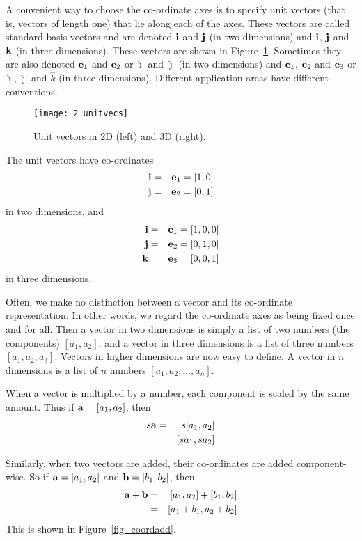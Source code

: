 A convenient way to choose the co-ordinate axes is to specify unit
vectors (that is, vectors of length one) that lie along each of the
axes. These vectors are called standard basis vectors and are denoted
${\bf i}$ and ${\bf j}$ (in two dimensions) and ${\bf i}$, ${\bf j}$
and ${\bf k}$ (in three dimensions). These vectors are shown in 
Figure~\ref{fig_unitvecs}. Sometimes they are also denoted
${\bf e}_1$ and ${\bf e}_2$ or $\hat{\imath}$ and $\hat{\jmath}$ 
(in two dimensions) and ${\bf e}_1$, 
${\bf e}_2$ and ${\bf e}_3$ or $\hat{\imath}$, $\hat{\jmath}$ and $\hat{k}$ (in three dimensions). 
Different application areas have different conventions. 

\begin{figure}
\centerline{\texttt{[image: 2\_unitvecs]}}
\caption{Unit vectors in 2D (left) and 3D (right). \label{fig_unitvecs}}
\end{figure}

The unit vectors have co-ordinates 
\begin{eqnarray*}
{\bf i} &=& {\bf e}_1=[1,0] \\
{\bf j} &=& {\bf e}_2=[0,1] 
\end{eqnarray*}
in two dimensions, and
\begin{eqnarray*}
{\bf i}&=&{\bf e}_1=[1,0,0] \\
{\bf j}&=&{\bf e}_2=[0,1,0] \\
{\bf k}&=&{\bf e}_3=[0,0,1]
\end{eqnarray*}
in three dimensions.

Often, we make no distinction between a vector and its co-ordinate
representation. In other words, we regard the co-ordinate axes as
being fixed once and for all. Then a vector in two dimensions is
simply a list of two numbers (the components) $[a_1,a_2]$, and a
vector in three dimensions is a list of three numbers
$[a_1,a_2,a_3]$. Vectors in higher dimensions are now easy to
define. A vector in $n$ dimensions is a list of $n$ numbers
$[a_1,a_2,\ldots,a_n]$.

When a vector is multiplied by a number, each component is scaled by
the same amount. Thus if $\aa = [a_1,a_2]$, then
\begin{eqnarray*}
s\aa &=& s[a_1,a_2] \\
&=& [sa_1,sa_2]
\end{eqnarray*}

Similarly, when two vectors are added, their co-ordinates are added
component-wise. So if $\aa = [a_1,a_2]$ and $\bb=[b_1,b_2]$, then
\begin{eqnarray*}
\aa+\bb&=&[a_1,a_2]+[b_1,b_2]\\
&=&[a_1+b_1,a_2+b_2]
\end{eqnarray*}
This is shown in Figure~\ref{fig_coordadd}. 

